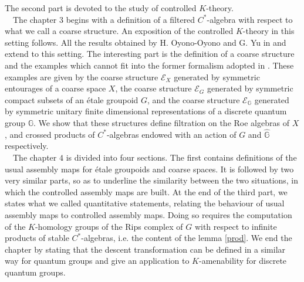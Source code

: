 The second part is devoted to the study of controlled $K$-theory. \\

\ \ The chapter $3$ begins with a definition of a filtered $C^*$-algebra with respect to what we call a coarse structure. An exposition of the controlled $K$-theory in this setting follows. All the results obtained by H. Oyono-Oyono and G. Yu in \cite{OY2} and \cite{OY3} extend to this setting. The interesting part is the definition of a coarse structure and the examples which cannot fit into the former formalism adopted in \cite{OY2}. These examples are given by the coarse structure $\mathcal E_X$ generated by symmetric entourages of a coarse space $X$, the coarse structure $\mathcal E_G$ generated by symmetric compact subsets of an étale groupoid $G$, and the coarse structure $\mathcal E_{\mathbb G}$ generated by symmetric unitary finite dimensional representations of a discrete quantum group $\mathbb G$. We show that these structures define filtration on the Roe algebras of $X$, and crossed products of $C^*$-algebras endowed with an action of $G$ and $\hat{\mathbb G}$ respectively.\\

\ \ The chapter $4$ is divided into four sections. The first contains definitions of the usual assembly maps for étale groupoids and coarse spaces. It is followed by two very similar parts, so as to underline the similarity between the two situations, in which the controlled assembly maps are built. %
At the end of the third part, we states what we called quantitative statements, relating the behaviour of usual assembly maps to controlled assembly maps. Doing so requires the computation of the $K$-homology groups of the Rips complex of $G$ with respect to infinite products of stable $C^*$-algebras, i.e. the content of the lemma \ref{prod}. We end the chapter by stating that the descent transformation can be defined in a similar way for quantum groups and give an application to $K$-amenability for discrete quantum groups.\\

